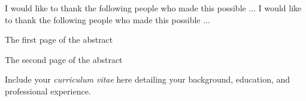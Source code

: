 \documentclass[11 pt]{report}
\begin{document}
\noindent I would like to thank the following people who made this possible ...
I would like to thank the following people who made this possible ...


\tableofcontents

\listoftables

\listoffigures

\abstractpage

The first page of the abstract

\abstractmultiplepage

The second page of the abstract

\startofchapters




\appendix
\appendixeqnumbering








\cvpage

\noindent Include your \emph{curriculum vitae} here detailing your background,
education, and professional experience.
\end{document}
